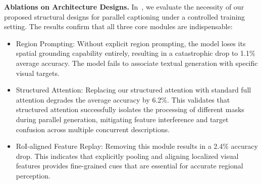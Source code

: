 \documentclass{llmxive}
\providecommand{\arraystretch}{1.3}
\begin{document}
\begin{table}[htbp]
\centering
\label{tab:component_ablation}
\setlength{\tabcolsep}{6pt}
\renewcommand{\arraystretch}{1.15}
\caption{Ablations on core design choices for parallel captioning under the same training setting, including module design and attention masking strategy. Results show that \textit{region prompting}, \textit{RoI-aligned feature replay}, and \textit{structured attention} are all important for the final performance. Following the judge-scoring protocol, Pos/Neg scores can be slightly negative when penalties dominate.}
\end{table}

\noindent
\textbf{Ablations on Architecture Designs.}
In~, we evaluate the necessity of our proposed structural designs for parallel captioning under a controlled training setting. The results confirm that all three core modules are indispensable:
\begin{itemize}
    \item Region Prompting: Without explicit region prompting, the model loses its spatial grounding capability entirely, resulting in a catastrophic drop to 1.1\% average accuracy. The model fails to associate textual generation with specific visual targets.
    \item Structured Attention: Replacing our structured attention with standard full attention degrades the average accuracy by 6.2\%. This validates that structured attention successfully isolates the processing of different masks during parallel generation, mitigating feature interference and target confusion across multiple concurrent descriptions.
    \item RoI-aligned Feature Replay: Removing this module results in a 2.4\% accuracy drop. This indicates that explicitly pooling and aligning localized visual features provides fine-grained cues that are essential for accurate regional perception.
\end{itemize}
\end{document}
